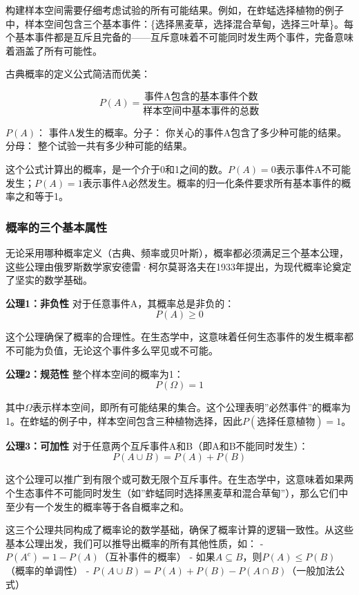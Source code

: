 \documentclass[
]{book}
\begin{document}
构建样本空间需要仔细考虑试验的所有可能结果。例如，在蚱蜢选择植物的例子中，样本空间包含三个基本事件：\{选择黑麦草，选择混合草甸，选择三叶草\}。每个基本事件都是互斥且完备的------互斥意味着不可能同时发生两个事件，完备意味着涵盖了所有可能性。

古典概率的定义公式简洁而优美：

\[P(A) = \frac{\text{事件A包含的基本事件个数}}{\text{样本空间中基本事件的总数}}\]

\(P(A)\)： 事件A发生的概率。分子： 你关心的事件A包含了多少种可能的结果。分母： 整个试验一共有多少种可能的结果。

这个公式计算出的概率，是一个介于0和1之间的数。\(P(A)=0\)表示事件A不可能发生；\(P(A)=1\)表示事件A必然发生。概率的归一化条件要求所有基本事件的概率之和等于1。

\hypertarget{ux6982ux7387ux7684ux4e09ux4e2aux57faux672cux5c5eux6027}{%
\subsubsection{概率的三个基本属性}\label{ux6982ux7387ux7684ux4e09ux4e2aux57faux672cux5c5eux6027}}

无论采用哪种概率定义（古典、频率或贝叶斯），概率都必须满足三个基本公理，这些公理由俄罗斯数学家安德雷·柯尔莫哥洛夫在1933年提出，为现代概率论奠定了坚实的数学基础。

\textbf{公理1：非负性}
对于任意事件A，其概率总是非负的：
\[P(A) \geq 0\]

这个公理确保了概率的合理性。在生态学中，这意味着任何生态事件的发生概率都不可能为负值，无论这个事件多么罕见或不可能。

\textbf{公理2：规范性}
整个样本空间的概率为1：
\[P(\Omega) = 1\]

其中\(\Omega\)表示样本空间，即所有可能结果的集合。这个公理表明''必然事件''的概率为1。在蚱蜢的例子中，样本空间包含三种植物选择，因此\(P(\text{选择任意植物}) = 1\)。

\textbf{公理3：可加性}
对于任意两个互斥事件A和B（即A和B不能同时发生）：
\[P(A \cup B) = P(A) + P(B)\]

这个公理可以推广到有限个或可数无限个互斥事件。在生态学中，这意味着如果两个生态事件不可能同时发生（如''蚱蜢同时选择黑麦草和混合草甸''），那么它们中至少有一个发生的概率等于各自概率之和。

这三个公理共同构成了概率论的数学基础，确保了概率计算的逻辑一致性。从这些基本公理出发，我们可以推导出概率的所有其他性质，如：
- \(P(A^c) = 1 - P(A)\)（互补事件的概率）
- 如果\(A \subseteq B\)，则\(P(A) \leq P(B)\)（概率的单调性）
- \(P(A \cup B) = P(A) + P(B) - P(A \cap B)\)（一般加法公式）
\end{document}
